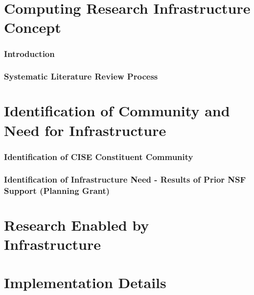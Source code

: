 \part{Computing Research Infrastructure Concept}


\section{Introduction}
\label{sec:intro}


\section{Systematic Literature Review Process}
\label{sec:process}


\part{Identification of Community and Need for Infrastructure}
\label{sec:identification:needs}


\section{Identification of CISE Constituent Community}
\label{sec:community:needs}


\section{Identification of Infrastructure Need - Results of Prior NSF Support (Planning Grant)}
\label{sec:planning:results}


\part{Research Enabled by Infrastructure}
\label{sec:research:enabled}


\part{Implementation Details}
\label{sec:implementation}


